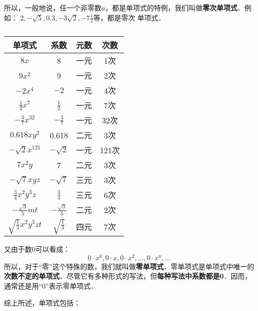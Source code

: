 所以，一般地说，任一个非零数$a$，都是单项式的特例，我们叫做\textbf{零次单项式}．例如：
$2,-\sqrt{5}, 0.3,-3\sqrt{2},-7\frac{1}{2}$等，都是零次
单项式．
\begin{table}
    \caption{}
    \begin{center}
        \begin{tabular}{cccc}
            \hline
            单项式&        系数& 元数&        次数 \\
            \hline
            $8x$& 8& 一元 & 1次\\
            $9x^2$& 9& 一元 & 2次\\
            $-2x^4$& $-2$& 一元 & 4次\\
            $\frac{1}{2}x^7$& $\frac{1}{2}$& 一元 & 7次\\
            $-\frac{3}{7}x^{32}$& $-\frac{3}{7}$& 一元 & 32次\\
            $0.618xy^2$& 0.618 & 二元& 3次  \\
            $-\sqrt{2}x^{121}$& $-\sqrt{2}$ & 一元& 121次     \\
             $7x^2y$ & 7 & 二元& 3次    \\
              $-\sqrt{7}xyz$ & $-\sqrt{7}$ & 三元& 3次     \\
              $\frac{3}{4}x^2y^3z$  & $\frac{3}{4}$ & 三元& 6次   \\
            $-\frac{\sqrt{3}}{5}mt$  & $-\frac{\sqrt{3}}{5}$ & 二元& 2次   \\
            $\sqrt{\frac{1}{3}}x^2y^3zt$  & $\sqrt{\frac{1}{3}}$ & 四元& 7次    \\
            \hline
        \end{tabular}
    \end{center}
\end{table}



又由于数0可以看成：
\[0\cdot x^0, 0\cdot x, 0\cdot x^2, \ldots , 0\cdot x^n, \ldots\]
所以，对于“零”这个特殊的数，我们就叫做\textbf{零单项式}．零单项式是单项式中唯一的\textbf{次数不定的单项式}．尽管它有多种形式的写法，但\textbf{每种写法中系数都是0}．因而，通常还是用“0”表示零单项式．

综上所述，单项式包括：
\begin{center}
\end{center}

